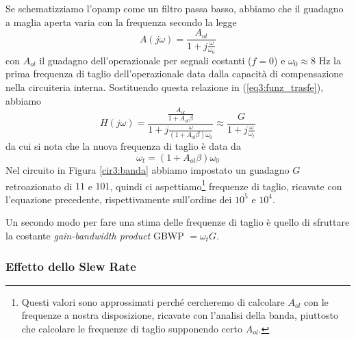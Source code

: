Se schematizziamo l'opamp come un filtro passa basso, abbiamo che il guadagno a maglia aperta varia con la frequenza secondo la legge
\begin{equation}
A(j\omega)=\frac{A_{ol}}{1+j\frac{\omega}{\omega_0}}
\label{eq3:passa_basso}
\end{equation}
con $A_{ol}$ il guadagno dell'operazionale per segnali costanti ($f = 0$) e $\omega_0 \approx 8$ \si{\hertz} la prima frequenza di taglio dell'operazionale data dalla capacità di compensazione nella circuiteria interna. Sostituendo questa relazione in (\ref{eq3:funz_trasfe}), abbiamo
\begin{equation}
H(j\omega)=\frac{\frac{A_{ol}}{1+A_{ol}\beta}}{1+j \frac{\omega}{(1+A_{ol}\beta)\omega_0}} \approx \frac{G}{1+j\frac{\omega}{\omega_t}}
\label{eq3:funzione_trasferimento}
\end{equation}
da cui si nota che la nuova frequenza di taglio è data da
\begin{equation}
\omega_t=(1+A_{ol}\beta)\omega_0
\label{eq3:freq_taglio}
\end{equation}
Nel circuito in Figura \ref{cir3:banda} abbiamo impostato un guadagno $G$ retroazionato di $11$ e $101$, quindi ci aspettiamo\footnote{Questi valori sono approssimati perché cercheremo di calcolare $A_{ol}$ con le frequenze a nostra disposizione, ricavate con l'analisi della banda, piuttosto che calcolare le frequenze di taglio supponendo certo $A_{ol}$.} frequenze di taglio, ricavate con l'equazione precedente, rispettivamente sull'ordine dei $10^5$ e $10^4$.

Un secondo modo per fare una stima delle frequenze di taglio è quello di sfruttare la costante \textit{gain-bandwidth product} GBWP $= \omega_t G$.

\subsubsection*{Effetto dello Slew Rate}

